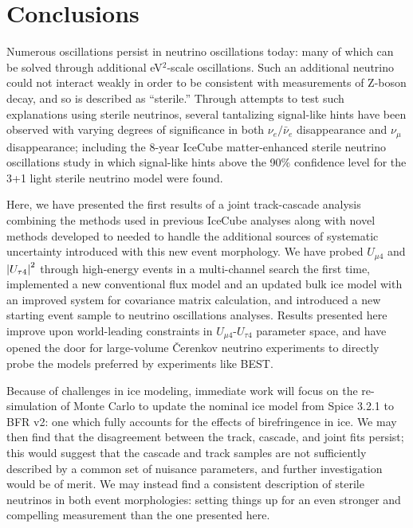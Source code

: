 \documentclass[main.tex]{subfiles}
\begin{document}
\section{Conclusions}

Numerous oscillations persist in neutrino oscillations today: many of which can be solved through additional eV$^{2}$-scale oscillations. 
Such an additional neutrino could not interact weakly in order to be consistent with measurements of Z-boson decay, and so is described as ``sterile.''
Through attempts to test such explanations using sterile neutrinos, several tantalizing signal-like hints have been observed with varying degrees of significance in both $\nu_{e}/\bar{\nu}_{e}$ disappearance and $\nu_{\mu}$ disappearance; including the 8-year IceCube matter-enhanced sterile neutrino oscillations study in which signal-like hints above the 90\% confidence level for the 3+1 light sterile neutrino model were found.

Here, we have presented the first results of a joint track-cascade analysis combining the methods used in previous IceCube analyses along with novel methods developed to needed to handle the additional sources of systematic uncertainty introduced with this new event morphology. 
We have probed $U_{\mu4}$ and $\left| U_{\tau4} \right|^{2}$ through high-energy events in a multi-channel search the first time, implemented a new conventional flux model and an updated bulk ice model with an improved system for covariance matrix calculation, and introduced a new starting event sample to neutrino oscillations analyses. 
Results presented here improve upon world-leading constraints in $U_{\mu4}$-$U_{\tau4}$ parameter space, and have opened the door for large-volume \v{C}erenkov neutrino experiments to directly probe the models preferred by experiments like BEST.

Because of challenges in ice modeling, immediate work will focus on the re-simulation of Monte Carlo to update the nominal ice model from Spice 3.2.1 to BFR v2: one which fully accounts for the effects of birefringence in ice.
We may then find that the disagreement between the track, cascade, and joint fits persist; this would suggest that the cascade and track samples are not sufficiently described by a common set of nuisance parameters, and further investigation would be of merit. 
We may instead find a consistent description of sterile neutrinos in both event morphologies: setting things up for an even stronger and compelling measurement than the one presented here. 
\end{document}
